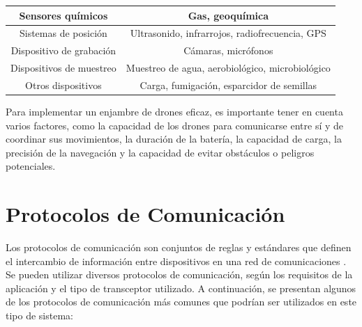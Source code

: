 \begin{table}[]
{\begin{tabular}{|cc|c|cl|c|c|c|}
  \multicolumn{3}{|c|}{Sensores químicos} &
  \multicolumn{5}{c|}{Gas, geoquímica}
  \\ \hline
  \multicolumn{3}{|c|}{Sistemas de posición} &
  \multicolumn{5}{c|}{Ultrasonido, infrarrojos, radiofrecuencia, GPS}
  \\ \hline
  \multicolumn{3}{|c|}{Dispositivo de grabación} &
  \multicolumn{5}{c|}{Cámaras, micrófonos}
  \\ \hline
  \multicolumn{3}{|c|}{Dispositivos de muestreo} &
  \multicolumn{5}{c|}{Muestreo de agua, aerobiológico, microbiológico}
  \\ \hline
  \multicolumn{3}{|c|}{Otros dispositivos} &
  \multicolumn{5}{c|}{Carga, fumigación, esparcidor de semillas}
  \\ \hline
\end{tabular}%
}
\end{table}

\noindent Para implementar un enjambre de drones eficaz, es importante tener en cuenta varios factores, como la capacidad de los drones para comunicarse entre sí y de coordinar sus movimientos, la duración de la batería, la capacidad de carga, la precisión de la navegación y la capacidad de evitar obstáculos o peligros potenciales.

\section{Protocolos de Comunicación}

Los protocolos de comunicación son conjuntos de reglas y estándares que definen el intercambio de información entre dispositivos en una red de comunicaciones \cite{52}. Se pueden utilizar diversos protocolos de comunicación, según los requisitos de la aplicación y el tipo de transceptor utilizado. A continuación, se presentan algunos de los protocolos de comunicación más comunes que podrían ser utilizados en este tipo de sistema:

